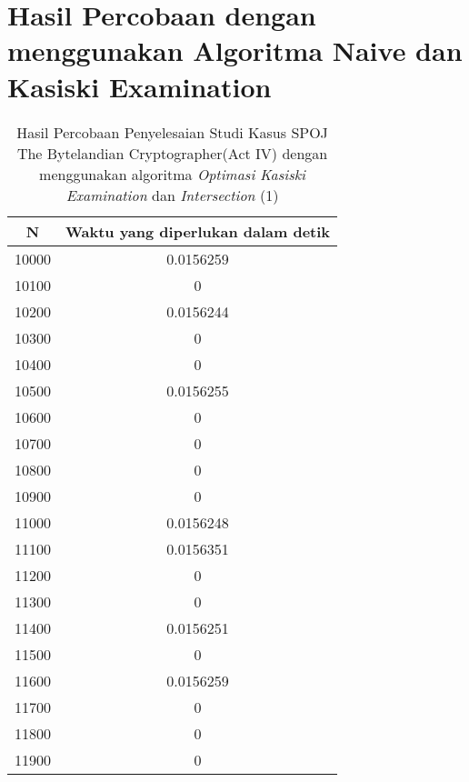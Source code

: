 \chapter{Hasil Percobaan dengan menggunakan Algoritma Naive dan Kasiski Examination}

\begin{table}[H]
\centering
\begin{tabular}{|c|c|}\hline
N&Waktu yang diperlukan dalam detik\\ \hline
10000&0.0156259\\ \hline
10100&0\\ \hline
10200&0.0156244\\ \hline
10300&0\\ \hline
10400&0\\ \hline
10500&0.0156255\\ \hline
10600&0\\ \hline
10700&0\\ \hline
10800&0\\ \hline
10900&0\\ \hline
11000&0.0156248\\ \hline
11100&0.0156351\\ \hline
11200&0\\ \hline
11300&0\\ \hline
11400&0.0156251\\ \hline
11500&0\\ \hline
11600&0.0156259\\ \hline
11700&0\\ \hline
11800&0\\ \hline
11900&0\\ \hline
\end{tabular}
\caption {Hasil Percobaan Penyelesaian Studi Kasus SPOJ The Bytelandian Cryptographer(Act IV) dengan menggunakan algoritma \textit{Optimasi Kasiski Examination} dan \textit{Intersection} (1)}
\label{tab1:res2}
\end{table}
